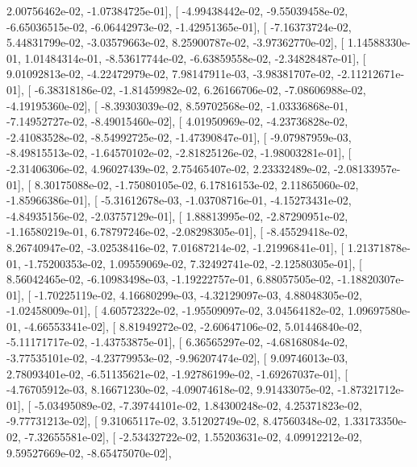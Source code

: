 \documentclass{article}
\begin{document}
          2.00756462e-02,  -1.07384725e-01],
       [ -4.99438442e-02,  -9.55039458e-02,  -6.65036515e-02,
         -6.06442973e-02,  -1.42951365e-01],
       [ -7.16373724e-02,   5.44831799e-02,  -3.03579663e-02,
          8.25900787e-02,  -3.97362770e-02],
       [  1.14588330e-01,   1.01484314e-01,  -8.53617744e-02,
         -6.63859558e-02,  -2.34828487e-01],
       [  9.01092813e-02,  -4.22472979e-02,   7.98147911e-03,
         -3.98381707e-02,  -2.11212671e-01],
       [ -6.38318186e-02,  -1.81459982e-02,   6.26166706e-02,
         -7.08606988e-02,  -4.19195360e-02],
       [ -8.39303039e-02,   8.59702568e-02,  -1.03336868e-01,
         -7.14952727e-02,  -8.49015460e-02],
       [  4.01950969e-02,  -4.23736828e-02,  -2.41083528e-02,
         -8.54992725e-02,  -1.47390847e-01],
       [ -9.07987959e-03,  -8.49815513e-02,  -1.64570102e-02,
         -2.81825126e-02,  -1.98003281e-01],
       [ -2.31406306e-02,   4.96027439e-02,   2.75465407e-02,
          2.23332489e-02,  -2.08133957e-01],
       [  8.30175088e-02,  -1.75080105e-02,   6.17816153e-02,
          2.11865060e-02,  -1.85966386e-01],
       [ -5.31612678e-03,  -1.03708716e-01,  -4.15273431e-02,
         -4.84935156e-02,  -2.03757129e-01],
       [  1.88813995e-02,  -2.87290951e-02,  -1.16580219e-01,
          6.78797246e-02,  -2.08298305e-01],
       [ -8.45529418e-02,   8.26740947e-02,  -3.02538416e-02,
          7.01687214e-02,  -1.21996841e-01],
       [  1.21371878e-01,  -1.75200353e-02,   1.09559069e-02,
          7.32492741e-02,  -2.12580305e-01],
       [  8.56042465e-02,  -6.10983498e-03,  -1.19222757e-01,
          6.88057505e-02,  -1.18820307e-01],
       [ -1.70225119e-02,   4.16680299e-03,  -4.32129097e-03,
          4.88048305e-02,  -1.02458009e-01],
       [  4.60572322e-02,  -1.95509097e-02,   3.04564182e-02,
          1.09697580e-01,  -4.66553341e-02],
       [  8.81949272e-02,  -2.60647106e-02,   5.01446840e-02,
         -5.11171717e-02,  -1.43753875e-01],
       [  6.36565297e-02,  -4.68168084e-02,  -3.77535101e-02,
         -4.23779953e-02,  -9.96207474e-02],
       [  9.09746013e-03,   2.78093401e-02,  -6.51135621e-02,
         -1.92786199e-02,  -1.69267037e-01],
       [ -4.76705912e-03,   8.16671230e-02,  -4.09074618e-02,
          9.91433075e-02,  -1.87321712e-01],
       [ -5.03495089e-02,  -7.39744101e-02,   1.84300248e-02,
          4.25371823e-02,  -9.77731213e-02],
       [  9.31065117e-02,   3.51202749e-02,   8.47560348e-02,
          1.33173350e-02,  -7.32655581e-02],
       [ -2.53432722e-02,   1.55203631e-02,   4.09912212e-02,
          9.59527669e-02,  -8.65475070e-02],
\end{document}
